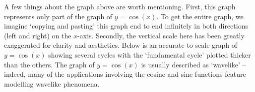 
A few things about the graph above are worth mentioning. First, this graph represents only part of the graph of $y = \cos(x)$.  To get the entire graph, we imagine `copying and pasting' this graph end to end infinitely in both directions (left and right) on the $x$-axis.  Secondly, the vertical scale here has been greatly exaggerated for clarity and aesthetics. Below is an accurate-to-scale graph of $y = \cos(x)$ showing several cycles with the `fundamental cycle' plotted thicker than the others.    The graph of $y=\cos(x)$ is usually described as `wavelike' -- indeed, many of the applications involving the cosine and sine functions feature modelling wavelike phenomena.   

